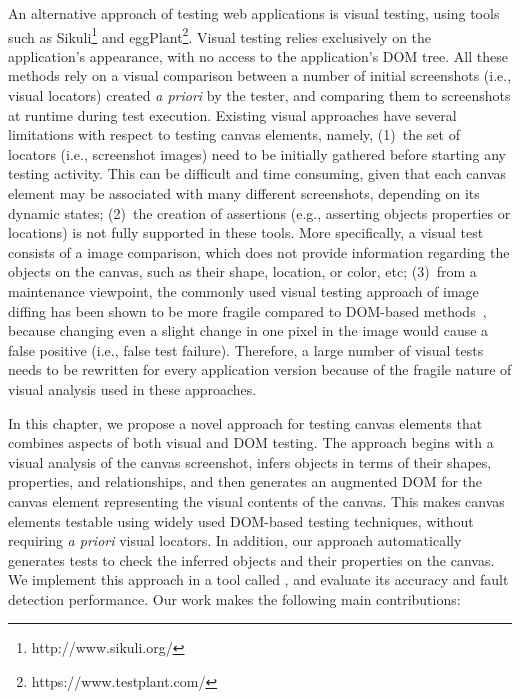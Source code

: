 An alternative approach of testing web applications is visual testing, using tools such as  Sikuli\footnote{http://www.sikuli.org/} and eggPlant\footnote{https://www.testplant.com/}. Visual testing relies exclusively on the application's appearance, with no access to the application's DOM tree. All these methods rely on a visual comparison between a number of initial screenshots (i.e., visual locators) created \textit{a priori} by the tester, and comparing them to screenshots at runtime during test execution.
Existing visual approaches have several limitations with respect to testing canvas elements, namely, (1)~the set of locators (i.e., screenshot images) need to be initially gathered before starting any testing activity. This can be difficult and time consuming, given that each canvas element may be associated with many different screenshots, depending on its dynamic states; (2)~the creation of assertions (e.g., asserting objects properties or locations) is not fully supported in these tools. More specifically, a visual test consists of a image comparison, which does not provide information regarding the objects on the canvas, such as their shape, location, or color, etc; 
(3)~from a maintenance viewpoint, the commonly used visual testing approach of image diffing has been shown to be more fragile compared to DOM-based methods~\cite{coppola_automated_2016,leotta_visual_2014}, because changing even a slight change in one pixel in the image would cause a false positive (i.e., false test failure). Therefore, a large number of visual tests needs to be rewritten for every application version because of the fragile nature of visual analysis used in these approaches.

In this chapter, we propose a novel approach for testing canvas elements that combines aspects of both visual and DOM testing. The approach begins with a visual analysis of the canvas screenshot, infers objects in terms of their shapes, properties, and relationships, and then generates an augmented DOM for the canvas element representing the visual contents of the canvas. This makes canvas elements testable using widely used DOM-based testing techniques,  without requiring \textit{a priori} visual locators. In addition, our approach automatically generates tests to check the inferred objects and their properties on the canvas. We implement this approach in a tool called \tool, and evaluate its accuracy and fault detection performance.
Our work makes the following main contributions: 

